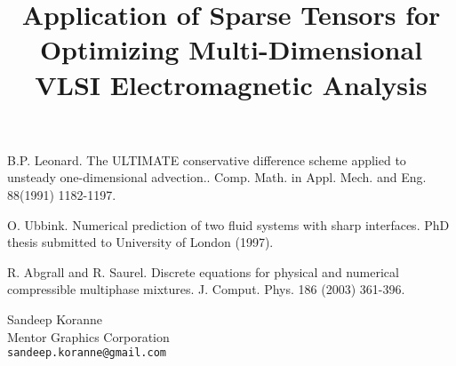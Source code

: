 \documentclass[article,A4,11pt]{llncs}%
\begin{document}

\begin{thebibliography}{10}
{\sc B.P. Leonard}. {The ULTIMATE conservative difference scheme applied to unsteady one-dimensional advection.}. Comp. Math. in Appl. Mech. and Eng. 88(1991) 1182-1197.

{\sc O. Ubbink}. {Numerical prediction of two fluid systems with sharp interfaces}. PhD thesis submitted to University of London (1997).

{\sc R. Abgrall and R. Saurel}. {Discrete equations for physical and numerical compressible multiphase mixtures}. J. Comput. Phys. 186 (2003) 361-396.
\end{thebibliography}

\title{Application of Sparse Tensors for Optimizing Multi-Dimensional VLSI Electromagnetic Analysis}
 \author{} \institute{}
\maketitle
\begin{center}
{\large Sandeep Koranne}\\
Mentor Graphics Corporation\\
{\tt sandeep.koranne@gmail.com}
\end{center}
\end{document}
